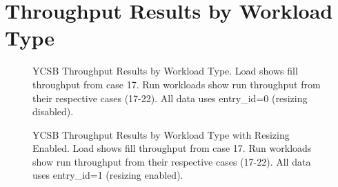 \section{Throughput Results by Workload Type}

\begin{figure}[p]
    \centering

    \begin{subfigure}[b]{0.24\textwidth}
        \centering
        \vspace{0.75cm}
    \end{subfigure}


    \caption{YCSB Throughput Results by Workload Type. Load shows fill throughput from case 17. Run workloads show run throughput from their respective cases (17-22). All data uses entry\_id=0 (resizing disabled).}
    \label{fig:throughput_subfigures}
\end{figure}

\begin{figure}[p]
    \centering

    \begin{subfigure}[b]{0.24\textwidth}
        \centering
        \vspace{0.75cm}
    \end{subfigure}


    \caption{YCSB Throughput Results by Workload Type with Resizing Enabled. Load shows fill throughput from case 17. Run workloads show run throughput from their respective cases (17-22). All data uses entry\_id=1 (resizing enabled).}
    \label{fig:throughput_subfigures_resizing}
\end{figure} 